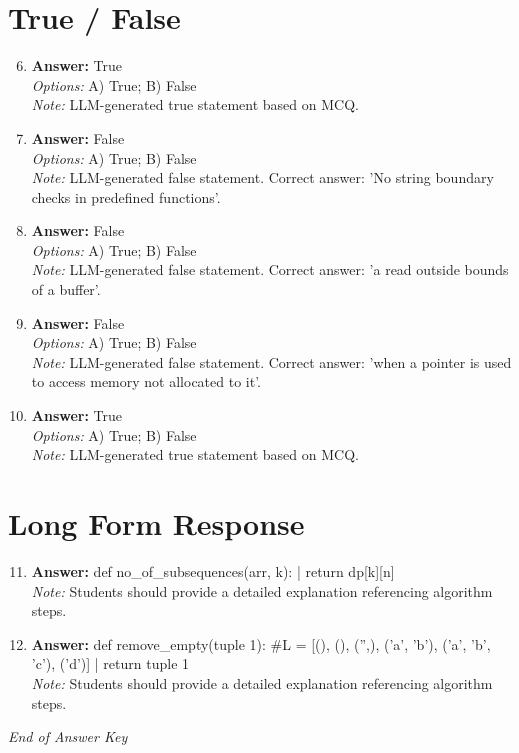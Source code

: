 \documentclass[12pt]{article}
\begin{document}
\section*{True / False}
\begin{enumerate}[label=\arabic*.]
\setcounter{enumi}{5}
\item \textbf{Answer:} True
\\ \textit{Options:} A) True; B) False
\\ \textit{Note:} LLM-generated true statement based on MCQ.
\item \textbf{Answer:} False
\\ \textit{Options:} A) True; B) False
\\ \textit{Note:} LLM-generated false statement. Correct answer: 'No string boundary checks in predefined functions'.
\item \textbf{Answer:} False
\\ \textit{Options:} A) True; B) False
\\ \textit{Note:} LLM-generated false statement. Correct answer: 'a read outside bounds of a buffer'.
\item \textbf{Answer:} False
\\ \textit{Options:} A) True; B) False
\\ \textit{Note:} LLM-generated false statement. Correct answer: 'when a pointer is used to access memory not allocated to it'.
\item \textbf{Answer:} True
\\ \textit{Options:} A) True; B) False
\\ \textit{Note:} LLM-generated true statement based on MCQ.
\end{enumerate}

\section*{Long Form Response}
\begin{enumerate}[label=\arabic*.]
\setcounter{enumi}{10}
\item \textbf{Answer:} def no\_of\_subsequences(arr, k): | return dp[k][n]
\\ \textit{Note:} Students should provide a detailed explanation referencing algorithm steps.
\item \textbf{Answer:} def remove\_empty(tuple 1): \#L = [(), (), ('',), ('a', 'b'), ('a', 'b', 'c'), ('d')] | return tuple 1
\\ \textit{Note:} Students should provide a detailed explanation referencing algorithm steps.
\end{enumerate}

\vfill
\noindent\textit{End of Answer Key}
\end{document}
